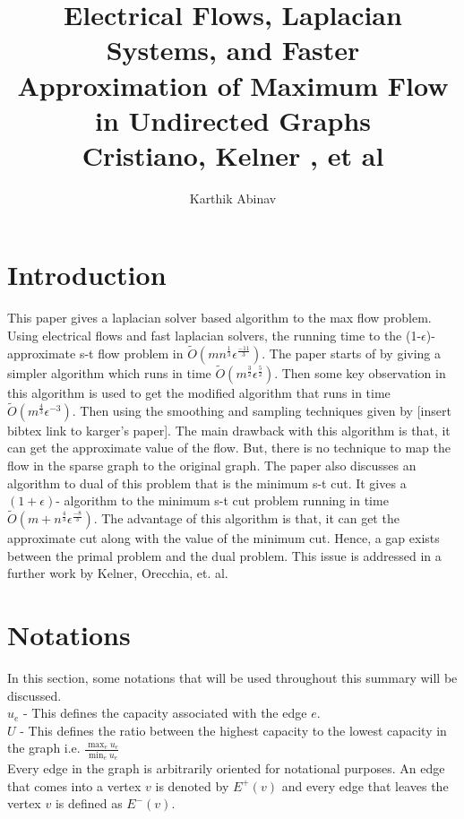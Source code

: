 \documentclass[a4paper,10pt]{article}
\title{Electrical Flows, Laplacian Systems, and Faster Approximation of
Maximum Flow in Undirected Graphs \\ Cristiano, Kelner , et al}
\author{Karthik Abinav}
\date{\vspace{-5ex}}
\newcommand{\wid}{\widetilde{O}}
\newcommand{\eps}{\epsilon}
\begin{document}
\maketitle

\section{Introduction}
  This paper gives a laplacian solver based algorithm to the max flow problem. Using electrical flows and fast laplacian solvers, the 
  running time to the (1-$\eps$)-approximate s-t flow problem in $\wid(mn^{\frac{1}{3}}\eps^{\frac{-11}{3}})$. The paper starts
  of by giving a simpler algorithm which runs in time $\wid(m^\frac{3}{2} \eps ^ \frac{5}{2})$. Then some key observation in this algorithm is used
  to get the modified algorithm that runs in time $\wid(m^\frac{4}{3} \eps^{-3})$. Then using the smoothing and sampling techniques given by 
  [insert bibtex link to karger's paper]. The main drawback with this algorithm is that, it can get the approximate value of the flow. But, 
  there is no technique to map the flow in the sparse graph to the original graph. The paper also discusses an algorithm to dual of this problem
  that is the minimum s-t cut. It gives a $(1+\eps)$- algorithm to the minimum s-t cut problem running in time $\wid(m+n^{\frac{4}{3}} \eps^{\frac{-8}{3}})$.
  The advantage of this algorithm is that, it can get the approximate cut along with the value of the minimum cut. Hence, a gap exists between
  the primal problem and the dual problem. This issue is addressed in a further work by Kelner, Orecchia, et. al.
  
 \section{Notations}
    In this section, some notations that will be used throughout this summary will be discussed. \\
    
    $u_e$ - This defines the capacity associated with the edge $e$. \\
    
    $U$ - This defines the ratio between the highest capacity to the lowest capacity in the graph i.e. $\frac{\displaystyle \max_{e} u_e}{\displaystyle \min_e u_e}$\\
    
    Every edge in the graph is arbitrarily oriented for notational purposes. An edge that comes into a vertex $v$ is denoted by $E^{+}(v)$ and
    every edge that leaves the vertex $v$ is defined as $E^{-}(v)$. \\
    
\end{document}
